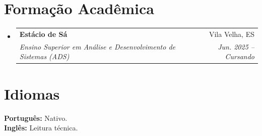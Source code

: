 \documentclass[letterpaper,11pt]{article}
\makeatletter
\newcommand{\resumeSubheading}[4]{
  \vspace{-2pt}\item
    \begin{tabular*}{0.97\textwidth}[t]{l@{\extracolsep{\fill}}r}
      \textbf{#1} & #2 \\
      \textit{\small#3} & \textit{\small #4} \\
    \end{tabular*}\vspace{-7pt}
}
\newcommand{\resumeSubHeadingListStart}{\begin{itemize}[leftmargin=0.15in, label={}]}
\newcommand{\resumeSubHeadingListEnd}{\end{itemize}}
\makeatother
\begin{document}
\section{Formação Acadêmica}
  \resumeSubHeadingListStart
    \resumeSubheading
      {Estácio de Sá}{Vila Velha, ES}
      {Ensino Superior em Análise e Desenvolvimento de Sistemas (ADS)}{Jun. 2025 -- Cursando}
  \resumeSubHeadingListEnd

\section{Idiomas}
 \begin{itemize}[leftmargin=0.15in, label={}]
    \small{\item{
     \textbf{Português:}{ Nativo.} \\
     \textbf{Inglês:}{ Leitura técnica.}
    }}
 \end{itemize}
\end{document}
